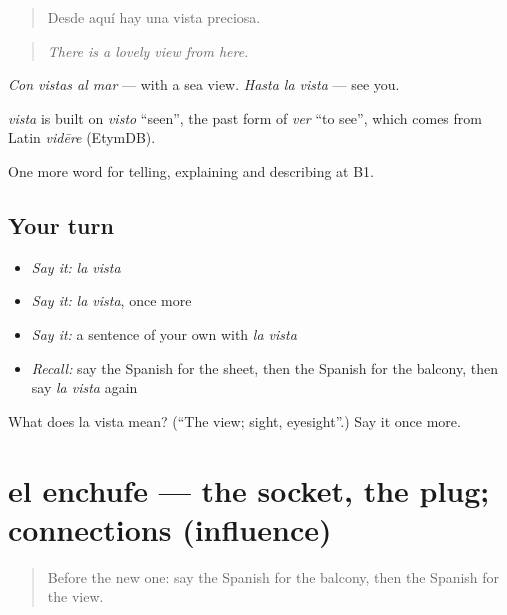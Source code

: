 \begin{quote}
Desde aquí hay una vista preciosa.
\end{quote}

\begin{quote}
\emph{There is a lovely view from here.}
\end{quote}

\emph{Con vistas al mar} — with a sea view. \emph{Hasta la vista} — see you.

\begin{cousinweb}
\emph{vista} is built on \emph{visto} \textquotedblleft{}seen\textquotedblright{}, the past form of \emph{ver} \textquotedblleft{}to see\textquotedblright{}, which comes from Latin \emph{vidēre} (EtymDB).
\end{cousinweb}

\begin{grammarlens}[title={What you've built}]
One more word for telling, explaining and describing at B1.
\end{grammarlens}

\subsection*{Your turn}
\begin{itemize}
\raggedright
  \item \emph{Say it:} \emph{la vista}
  \item \emph{Say it:} \emph{la vista}, once more
  \item \emph{Say it:} a sentence of your own with \emph{la vista}
  \item \emph{Recall:} say the Spanish for the sheet, then the Spanish for the balcony, then say \emph{la vista} again
\end{itemize}

\begin{tcolorbox}[breakable,colback=teal!4,colframe=teal!35!black,title={Before you move on}]
What does la vista mean? (\textquotedblleft{}The view; sight, eyesight\textquotedblright{}.) Say it once more.
\end{tcolorbox}
\section[el enchufe]{el enchufe — the socket, the plug; connections (influence)}

\label{lesson:ES-C664-enchufe}



\begin{quote}
Before the new one: say the Spanish for the balcony, then the Spanish for the view.
\end{quote}

